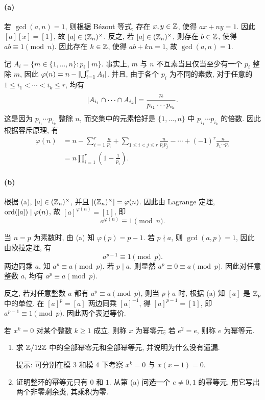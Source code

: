 \documentclass{article}
\begin{document}
\begin{solution}
	\paragraph{(a)} 若 $\gcd(a,n) = 1$, 则根据 Bézout 等式, 存在 $x,y \in \mathbb{Z}$, 使得 $ax + ny = 1$. 因此 $[a][x] = [1]$, 故 $[a] \in (\mathbb{Z}_n)^\times$. 反之, 若 $[a] \in (\mathbb{Z}_n)^\times$, 则存在 $b \in \mathbb{Z}$, 使得 $ab \equiv 1 \pmod n$. 因此存在 $k \in \mathbb{Z}$, 使得 $ab + kn = 1$, 故 $\gcd(a,n) = 1$.

	记 $A_i = \{m \in \{1,\dots,n\}: p_i \mid m\}$. 事实上, $m$ 与 $n$ 不互素当且仅当至少有一个 $p_i$ 整除 $m$, 因此 $\varphi(n) = n - \left|\bigcup_{i=1}^r A_i\right|$. 并且, 由于各个 $p_i$ 为不同的素数, 对于任意的 $1 \le i_1 < \cdots < i_k \le r$, 均有
	\[ \left|A_{i_1} \cap \cdots \cap A_{i_k}\right| = \frac{n}{p_{i_1}\cdots p_{i_k}}. \]
	这是因为 $p_{i_1}\cdots p_{i_k}$ 整除 $n$, 而交集中的元素恰好是 $\{1,\dots,n\}$ 中 $p_{i_1}\cdots p_{i_k}$ 的倍数. 因此根据容斥原理, 有
	\begin{align*}
		\varphi(n)
		&= n - \sum_{i=1}^r \frac{n}{p_i} + \sum_{1 \le i<j \le r} \frac{n}{p_i p_j} - \cdots + (-1)^r \frac{n}{p_1\cdots p_r} \\
		&= n\prod_{i=1}^r \left(1 - \frac{1}{p_i}\right).
	\end{align*}

	\paragraph{(b)} 根据 (a), $[a] \in (\mathbb{Z}_n)^\times$, 并且 $\left|(\mathbb{Z}_n)^\times\right| = \varphi(n)$. 因此由 Lagrange 定理, $\operatorname{ord}([a]) \mid \varphi(n)$, 故 $[a]^{\varphi(n)} = [1]$, 即
	\[ a^{\varphi(n)} \equiv 1 \pmod n. \]

	当 $n = p$ 为素数时, 由 (a) 知 $\varphi(p) = p-1$. 若 $p \nmid a$, 则 $\gcd(a,p) = 1$, 因此由欧拉定理, 有
	\[ a^{p-1} \equiv 1 \pmod p. \]
	两边同乘 $a$, 知 $a^p \equiv a \pmod p$. 若 $p \mid a$, 则显然 $a^p \equiv 0 \equiv a \pmod p$. 因此对任意整数 $a$, 均有 $a^p \equiv a \pmod p$.

	反之, 若对任意整数 $a$ 都有 $a^p \equiv a \pmod p$, 则当 $p \nmid a$ 时, 根据 (a) 知 $[a]$ 是 $\mathbb{Z}_p$ 中的单位. 在 $[a]^p = [a]$ 两边同乘 $[a]^{-1}$, 得 $[a]^{p-1} = [1]$, 即 $a^{p-1} \equiv 1 \pmod p$. 因此两个表述等价.
\end{solution}



\begin{problem}
若 $x^k=0$ 对某个整数 $k\ge1$ 成立, 则称 $x$ 为幂零元; 若 $e^2=e$, 则称 $e$ 为幂等元.
\begin{enumerate}
  \item[(a)] 求 $\mathbb{Z}/12\mathbb{Z}$ 中的全部幂零元和全部幂等元, 并说明为什么没有遗漏.

  提示: 可分别在模 $3$ 和模 $4$ 下考察 $x^k=0$ 与 $x(x-1)=0$.
  \item[(b)] 证明整环的幂等元只有 $0$ 和 $1$. 从第 (a) 问选一个 $e\ne0,1$ 的幂等元, 用它写出两个非零剩余类, 其乘积为零.
\end{enumerate}
\end{problem}
\end{document}
